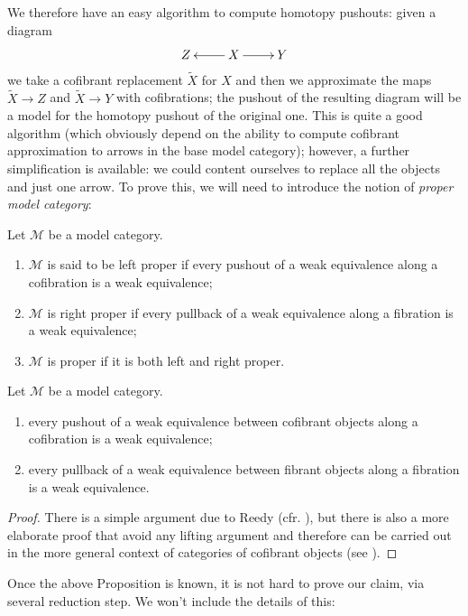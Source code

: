 \begin{refsection}
We therefore have an easy algorithm to compute homotopy pushouts: given a diagram
\[
\xymatrix{
Z & X \ar[l] \ar[r] & Y
}
\]
we take a cofibrant replacement $\widetilde{X}$ for $X$ and then we approximate the maps $\widetilde{X} \to Z$ and $\widetilde{X} \to Y$ with cofibrations; the pushout of the resulting diagram will be a model for the homotopy pushout of the original one. This is quite a good algorithm (which obviously depend on the ability to compute cofibrant approximation to arrows in the base model category); however, a further simplification is available: we could content ourselves to replace all the objects and just one arrow. To prove this, we will need to introduce the notion of \emph{proper model category}:

\begin{defin}
Let $\mathcal M$ be a model category.
\begin{enumerate}
\item $\mathcal M$ is said to be left proper if every pushout of  a weak equivalence along a cofibration is a weak equivalence;
\item $\mathcal M$ is right proper if every pullback of a weak equivalence along a fibration is a weak equivalence;
\item $\mathcal M$ is proper if it is both left and right proper.
\end{enumerate}
\end{defin}

\begin{prop}
Let $\mathcal M$ be a model category.
\begin{enumerate}
\item every pushout of a weak equivalence between cofibrant objects along a cofibration is a weak equivalence;
\item every pullback of a weak equivalence between fibrant objects along a fibration is a weak equivalence.
\end{enumerate}
\end{prop}

\begin{proof}
There is a simple argument due to Reedy (cfr. \cite[Proposition 13.1.2]{hirschhorn}), but there is also a more elaborate proof that avoid any lifting argument and therefore can be carried out in the more general context of categories of cofibrant objects (see \cite[Proposition II.8.5]{gj}).
\end{proof}

Once the above Proposition is known, it is not hard to prove our claim, via several reduction step. We won't include the details of this:


\end{refsection}
